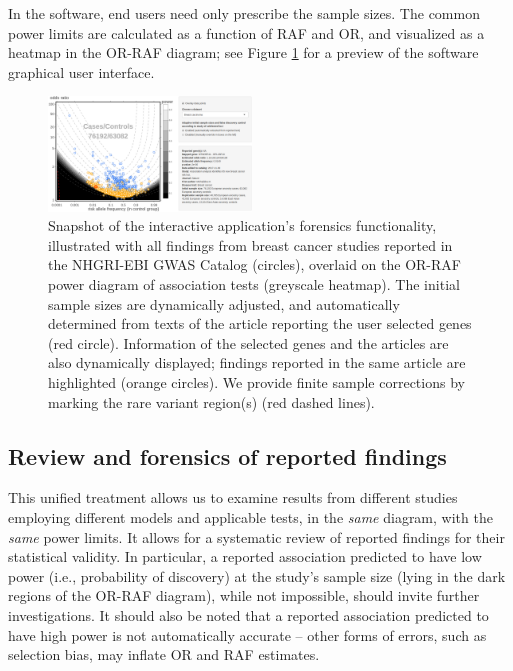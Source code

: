 In the software, end users need only prescribe the sample sizes. 
The common power limits are calculated as a function of RAF and OR, and visualized as a heatmap in the OR-RAF diagram; see Figure \ref{fig:02} for a preview of the software graphical user interface.

\begin{figure}[!tpb]%
\includegraphics[width=0.48\textwidth]{Screenshot_GWAS_calculator6.png}
\vspace{-20pt}
\caption{Snapshot of the interactive application's forensics functionality, illustrated with all findings from breast cancer studies reported in the NHGRI-EBI GWAS Catalog (circles),
overlaid on the OR-RAF power diagram of association tests (greyscale heatmap).
The initial sample sizes are dynamically adjusted, and automatically determined from texts of the article reporting the user selected genes (red circle). 
Information of the selected genes and the articles are also dynamically displayed; findings reported in the same article are highlighted (orange circles).
We provide finite sample corrections by marking the rare variant region(s) (red dashed lines).
}\label{fig:02}
\end{figure}

\vspace{-5pt}
\subsection{Review and forensics of reported findings}

This unified treatment allows us to examine results from different studies employing different models and applicable tests, in the \emph{same} diagram, with the \emph{same} power limits.
It allows for a systematic review of reported findings for their statistical validity. 
In particular, a reported association predicted to have low power (i.e., probability of discovery) at the study's sample size (lying in the dark regions of the OR-RAF diagram), while not impossible, should invite further investigations. {It should also be noted that a reported association predicted to have high power is not automatically accurate -- other forms of errors, such as selection bias, may inflate OR and RAF estimates.}

